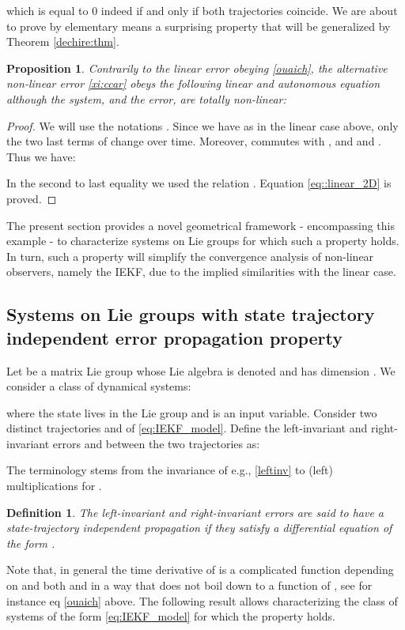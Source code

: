 \documentclass[a4paper,12pt,onecolumn]{article}
\newtheorem{prop}{Proposition}
\newtheorem{defn}{Definition}
\begin{document}
which is equal to 0 indeed if and only if both trajectories coincide. We are about to prove by elementary means a surprising property that will be generalized by Theorem \ref{dechire:thm}.
\begin{prop}Contrarily to the linear error obeying  \eqref{ouaich}, the alternative non-linear error \eqref{xi:ccar} obeys the following  \emph{linear} and autonomous equation although the system, and the error, are totally non-linear:

\end{prop}
\begin{proof}
We will use the notations   . Since we have   as in the linear case above, only the two last terms of  change over time. Moreover,  commutes with ,  and  and . Thus we have:

In the second to last equality we used the relation . Equation \eqref{eq::linear_2D} is proved.
\end{proof}
 The present section provides a novel geometrical framework - encompassing this example - to characterize systems on Lie groups for which such a property holds. In turn, such a property will simplify the convergence analysis of non-linear observers, namely the IEKF,  due to the implied similarities with the linear case. 






\subsection{Systems on Lie groups with state trajectory independent error propagation property}

Let  be a matrix Lie group whose Lie algebra is denoted  and has dimension . We consider a class of dynamical systems:

where the state  lives in the Lie group  and  is an input variable. Consider two distinct trajectories  and  of \eqref{eq:IEKF_model}.  Define the left-invariant and right-invariant errors   and  between the two trajectories as:


The  terminology stems from the invariance of e.g.,  \eqref{leftinv} to (left) multiplications  for . 
\begin{defn}
The left-invariant and right-invariant errors are said to have a  state-trajectory independent propagation if they satisfy a differential equation of the form .
\end{defn}

Note that, in general the time derivative of  is a complicated function depending on  and both  and  in a way that does not boil down to a function of , see for instance eq \eqref{ouaich} above. The following result allows characterizing the class of systems of the form \eqref{eq:IEKF_model} for which the property holds. 
\end{document}
